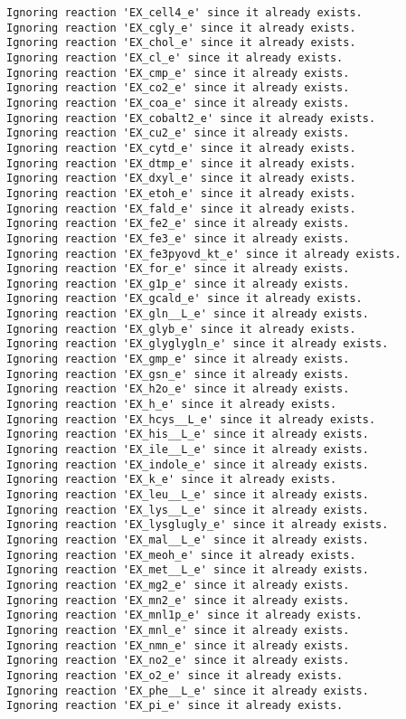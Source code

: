 \documentclass[
  letterpaper,
  DIV=11,
  numbers=noendperiod]{scrartcl}
\begin{document}
\begin{verbatim}
Ignoring reaction 'EX_cell4_e' since it already exists.
Ignoring reaction 'EX_cgly_e' since it already exists.
Ignoring reaction 'EX_chol_e' since it already exists.
Ignoring reaction 'EX_cl_e' since it already exists.
Ignoring reaction 'EX_cmp_e' since it already exists.
Ignoring reaction 'EX_co2_e' since it already exists.
Ignoring reaction 'EX_coa_e' since it already exists.
Ignoring reaction 'EX_cobalt2_e' since it already exists.
Ignoring reaction 'EX_cu2_e' since it already exists.
Ignoring reaction 'EX_cytd_e' since it already exists.
Ignoring reaction 'EX_dtmp_e' since it already exists.
Ignoring reaction 'EX_dxyl_e' since it already exists.
Ignoring reaction 'EX_etoh_e' since it already exists.
Ignoring reaction 'EX_fald_e' since it already exists.
Ignoring reaction 'EX_fe2_e' since it already exists.
Ignoring reaction 'EX_fe3_e' since it already exists.
Ignoring reaction 'EX_fe3pyovd_kt_e' since it already exists.
Ignoring reaction 'EX_for_e' since it already exists.
Ignoring reaction 'EX_g1p_e' since it already exists.
Ignoring reaction 'EX_gcald_e' since it already exists.
Ignoring reaction 'EX_gln__L_e' since it already exists.
Ignoring reaction 'EX_glyb_e' since it already exists.
Ignoring reaction 'EX_glyglygln_e' since it already exists.
Ignoring reaction 'EX_gmp_e' since it already exists.
Ignoring reaction 'EX_gsn_e' since it already exists.
Ignoring reaction 'EX_h2o_e' since it already exists.
Ignoring reaction 'EX_h_e' since it already exists.
Ignoring reaction 'EX_hcys__L_e' since it already exists.
Ignoring reaction 'EX_his__L_e' since it already exists.
Ignoring reaction 'EX_ile__L_e' since it already exists.
Ignoring reaction 'EX_indole_e' since it already exists.
Ignoring reaction 'EX_k_e' since it already exists.
Ignoring reaction 'EX_leu__L_e' since it already exists.
Ignoring reaction 'EX_lys__L_e' since it already exists.
Ignoring reaction 'EX_lysglugly_e' since it already exists.
Ignoring reaction 'EX_mal__L_e' since it already exists.
Ignoring reaction 'EX_meoh_e' since it already exists.
Ignoring reaction 'EX_met__L_e' since it already exists.
Ignoring reaction 'EX_mg2_e' since it already exists.
Ignoring reaction 'EX_mn2_e' since it already exists.
Ignoring reaction 'EX_mnl1p_e' since it already exists.
Ignoring reaction 'EX_mnl_e' since it already exists.
Ignoring reaction 'EX_nmn_e' since it already exists.
Ignoring reaction 'EX_no2_e' since it already exists.
Ignoring reaction 'EX_o2_e' since it already exists.
Ignoring reaction 'EX_phe__L_e' since it already exists.
Ignoring reaction 'EX_pi_e' since it already exists.

\end{verbatim}
\end{document}
